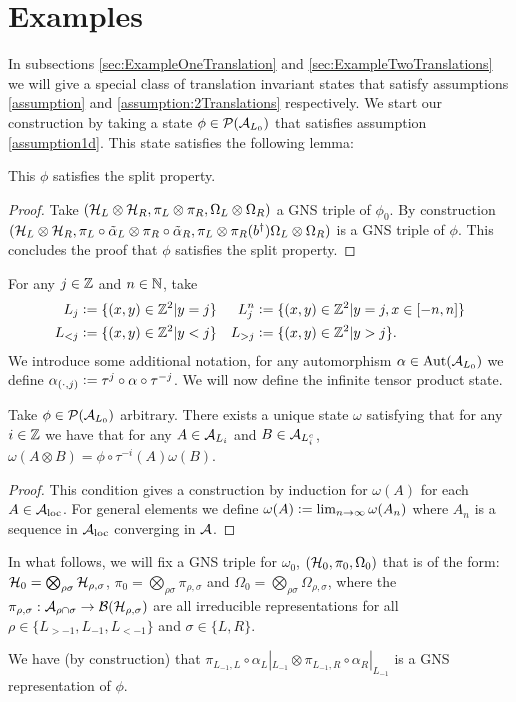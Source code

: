 \documentclass[11pt,a4paper,twoside]{article}
\numberwithin{equation}{section}
\begin{document}
	\section{Examples}\label{sec:examples}
	In subsections \ref{sec:ExampleOneTranslation} and \ref{sec:ExampleTwoTranslations} we will give a special class of translation invariant states that satisfy assumptions \ref{assumption} and \ref{assumption:2Translations} respectively. We start our construction by taking a state $\phi\in\PP(\AA_{L_0})$ that satisfies assumption \ref{assumption1d}. This state satisfies the following lemma:
	\begin{lemma}\label{lem:phiExampleConsistentWithConjectureSplitProperty}
		This $\phi$ satisfies the split property.
	\end{lemma}
	\begin{proof}
		Take $(\HH_L\otimes\HH_R,\pi_L\otimes\pi_R,\Omega_L\otimes\Omega_R)$ a GNS triple of $\phi_0$. By construction $(\HH_L\otimes\HH_R,\pi_L\circ\tilde\alpha_L\otimes\pi_R\circ\tilde\alpha_R,\pi_L\otimes\pi_R(b^\dagger)\Omega_L\otimes\Omega_R)$ is a GNS triple of $\phi$. This concludes the proof that $\phi$ satisfies the split property.
	\end{proof}
	For any $j\in\ZZ$ and $n\in\NN$, take
	\begin{align}
		L_j&\defeq \{(x,y)\in\ZZ^2|y=j\}&L_{j}^{n}&\defeq \{(x,y)\in\ZZ^2|y=j,x\in[-n,n]\}\\
		L_{<j}&\defeq \{(x,y)\in\ZZ^2|y<j\}&L_{>j}&\defeq \{(x,y)\in\ZZ^2|y>j\}.
	\end{align}
	We introduce some additional notation, for any automorphism $\alpha\in\Aut{\AA_{L_0}}$ we define $\alpha_{(\cdot,j)}\defeq \tau^j\circ\alpha\circ\tau^{-j}$. We will now define the infinite tensor product state.
	\begin{definition}\label{def:InfiniteTensorProductState}
		Take $\phi\in\PP(\AA_{L_0})$ arbitrary. There exists a unique state $\omega$ satisfying that for any $i\in\ZZ$ we have that for any $A\in\AA_{L_i}$ and $B\in\AA_{L_i^c}$, $\omega(A\otimes B)=\phi\circ\tau^{-i}(A)\omega(B)$.
	\end{definition}
	\begin{proof}
		This condition gives a construction by induction for $\omega(A)$ for each $A\in\AA_{\text{loc}}$. For general elements we define $\omega(A)\defeq \lim_{n\rightarrow\infty}\omega(A_n)$ where $A_n$ is a sequence in $\AA_{\text{loc}}$ converging in $\AA$.
	\end{proof}
	In what follows, we will fix a GNS triple for $\omega_0$, $(\HH_0,\pi_0,\Omega_0)$ that is of the form: $\HH_0=\bigotimes_{\rho\sigma}\HH_{\rho,\sigma}$, $\pi_0=\bigotimes_{\rho\sigma}\pi_{\rho,\sigma}$ and $\Omega_0=\bigotimes_{\rho\sigma}\Omega_{\rho,\sigma}$, where the $\pi_{\rho,\sigma}:\AA_{\rho\cap\sigma}\rightarrow\BB(\HH_{\rho,\sigma})$ are all irreducible representations for all $\rho\in \{L_{>-1},L_{-1},L_{<-1}\}$ and $\sigma\in\{L,R\}$.
	\begin{remark}\label{rem:GNS_One_Dimensional}
		We have (by construction) that $\pi_{L_{-1},L}\circ\alpha_L|_{L_{-1}}\otimes \pi_{L_{-1},R}\circ\alpha_R|_{L_{-1}}$ is a GNS representation of $\phi$. 
	\end{remark}
\end{document}
